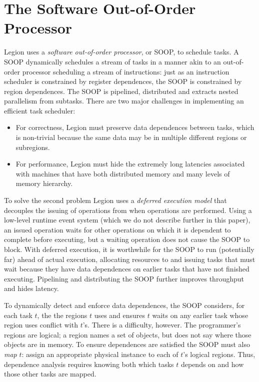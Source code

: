 \section{The Software Out-of-Order Processor}
\label{sec:soop}

Legion uses a {\em  software out-of-order processor}, or SOOP, to schedule tasks.  A SOOP 
dynamically schedules a stream of tasks in a manner akin to an out-of-order processor scheduling a stream of instructions:
just as an instruction scheduler is constrained by register dependences,
the SOOP is constrained by region dependences.
The SOOP  is pipelined, distributed and extracts nested parallelism from subtasks.
There are two major challenges in implementing an efficient task scheduler:
\begin{itemize}
\item  For correctness, Legion must preserve data dependences between tasks, which is non-trivial
because the same data may be in multiple different regions or subregions.
  
\item For performance, Legion must hide the extremely long latencies associated
  with machines that have both distributed memory and many levels of
  memory hierarchy.
\end{itemize}

To solve the second problem Legion uses a {\em deferred execution model} that decouples the issuing
of operations from when operations are performed.  Using a low-level runtime event system (which we do
not describe further in this paper), an issued operation waits for other operations on
which it is dependent to complete before executing, but a waiting operation does not cause the SOOP
to block.  With deferred execution, it is worthwhile for the SOOP to run (potentially far) ahead of actual execution,
allocating resources to and issuing tasks that must wait because they have data dependences on earlier tasks that have not 
finished executing.   Pipelining and distributing the SOOP further improves throughput and hides latency.

To dynamically detect and enforce data dependences,
the SOOP considers, for each task $t$, the
the regions $t$ uses and ensures $t$ waits on any
earlier task whose region uses conflict with $t$'s.  There is a
difficulty, however.  The programmer's regions are logical; a region
names a set of objects, but does not say where those objects
are in memory.  To ensure dependences are satisfied the SOOP must also {\em map} $t$: assign an
appropriate physical instance to each of $t$'s logical regions.  Thus, dependence
analysis requires knowing both which tasks $t$ depends on and how those
other tasks are mapped.

